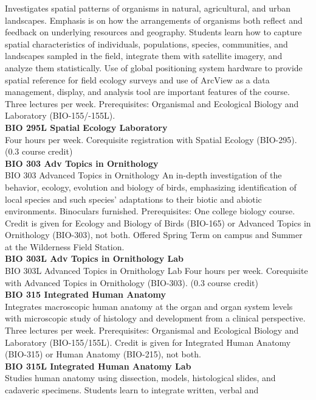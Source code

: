 \documentclass[
  letterpaper,
]{scrbook}
\begin{document}
Investigates spatial patterns of organisms in natural, agricultural, and
urban landscapes. Emphasis is on how the arrangements of organisms both
reflect and feedback on underlying resources and geography. Students
learn how to capture spatial characteristics of individuals,
populations, species, communities, and landscapes sampled in the field,
integrate them with satellite imagery, and analyze them statistically.
Use of global positioning system hardware to provide spatial reference
for field ecology surveys and use of ArcView as a data management,
display, and analysis tool are important features of the course. Three
lectures per week. Prerequisites: Organismal and Ecological Biology and
Laboratory (BIO-155/-155L).\\
\textbf{BIO 295L Spatial Ecology Laboratory}\\
Four hours per week. Corequisite registration with Spatial Ecology
(BIO-295). (0.3 course credit)\\
\textbf{BIO 303 Adv Topics in Ornithology}\\
BIO 303 Advanced Topics in Ornithology An in-depth investigation of the
behavior, ecology, evolution and biology of birds, emphasizing
identification of local species and such species' adaptations to their
biotic and abiotic environments. Binoculars furnished. Prerequisites:
One college biology course. Credit is given for Ecology and Biology of
Birds (BIO-165) or Advanced Topics in Ornithology (BIO-303), not both.
Offered Spring Term on campus and Summer at the Wilderness Field
Station.\\
\textbf{BIO 303L Adv Topics in Ornithology Lab}\\
BIO 303L Advanced Topics in Ornithology Lab Four hours per week.
Corequisite with Advanced Topics in Ornithology (BIO-303). (0.3 course
credit)\\
\textbf{BIO 315 Integrated Human Anatomy}\\
Integrates macroscopic human anatomy at the organ and organ system
levels with microscopic study of histology and development from a
clinical perspective. Three lectures per week. Prerequisites: Organismal
and Ecological Biology and Laboratory (BIO-155/155L). Credit is given
for Integrated Human Anatomy (BIO-315) or Human Anatomy (BIO-215), not
both.\\
\textbf{BIO 315L Integrated Human Anatomy Lab}\\
Studies human anatomy using dissection, models, histological slides, and
cadaveric specimens. Students learn to integrate written, verbal and
\end{document}
